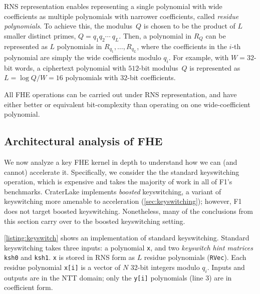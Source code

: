 RNS representation \cite{garner:1959:residue}  %
enables representing a single polynomial with wide coefficients as multiple polynomials with narrower coefficients,
called \emph{residue polynomials}.
To achieve this, the modulus~$Q$  is chosen to be the product of $L$
smaller distinct primes, $Q = q_1q_2\cdots\ q_L$.
Then, a polynomial in $R_Q$ can be represented as $L$ polynomials in
$R_{q_1}, \ldots, R_{q_L}$,
where the coefficients in the $i$-th polynomial are simply the wide coefficients modulo $q_i$.
%
For example, with $W = 32$-bit words, a ciphertext polynomial with $512$-bit modulus~$Q$ is represented as
$L = \log Q/W = 16$ polynomials with $32$-bit coefficients.

All FHE operations can be carried out under RNS representation, and have either better or equivalent bit-complexity than
  operating on one wide-coefficient polynomial.

\subsection{Architectural analysis of FHE}
\label{sec:fhe_analysis}

We now analyze a key FHE kernel in depth to understand how we can (and cannot) accelerate it.
Specifically, we consider the the standard keyswitching operation,
which is expensive and takes the majority of work in all of F1's benchmarks.
CraterLake implements \emph{boosted} keyswitching, a variant of keyswitching more amenable
to acceleration (\autoref{sec:keyswitching}); however, F1 does not target boosted keyswitching.
Nonetheless, many of the conclusions from this section carry over to the boosted keyswitching setting.

\autoref{listing:keyswitch} shows an implementation of standard keyswitching.
Standard keyswitching takes three inputs: a polynomial \texttt{x}, and two
\emph{keyswitch hint matrices} \texttt{ksh0} and \texttt{ksh1}. \texttt{x} is
stored in RNS form as $L$ residue polynomials (\texttt{RVec}). Each residue
polynomial \texttt{x[i]} is a vector of $N$ 32-bit integers modulo $q_i$.
Inputs and outputs are in the NTT domain; only the \texttt{y[i]} polynomials
(line 3) are in coefficient form.


